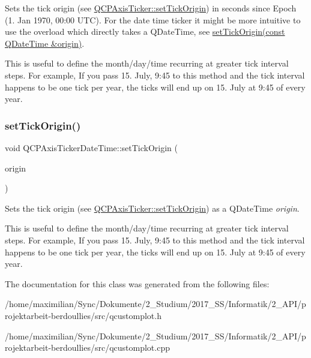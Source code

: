 Sets the tick origin (see \hyperlink{class_q_c_p_axis_ticker_ab509c7e500293bf66a8409f0d7c23943}{Q\+C\+P\+Axis\+Ticker\+::set\+Tick\+Origin}) in seconds since Epoch (1. Jan 1970, 00\+:00 U\+TC). For the date time ticker it might be more intuitive to use the overload which directly takes a Q\+Date\+Time, see \hyperlink{class_q_c_p_axis_ticker_date_time_a2ea905872b8171847a49a5e093fb0c48}{set\+Tick\+Origin(const Q\+Date\+Time \&origin)}.

This is useful to define the month/day/time recurring at greater tick interval steps. For example, If you pass 15. July, 9\+:45 to this method and the tick interval happens to be one tick per year, the ticks will end up on 15. July at 9\+:45 of every year. \mbox{\label{class_q_c_p_axis_ticker_date_time_a2ea905872b8171847a49a5e093fb0c48}} 
\subsubsection{\texorpdfstring{set\+Tick\+Origin()}{setTickOrigin()}\hspace{0.1cm}{\footnotesize\ttfamily [2/2]}}
{\footnotesize\ttfamily void Q\+C\+P\+Axis\+Ticker\+Date\+Time\+::set\+Tick\+Origin (\begin{DoxyParamCaption}\item[{const Q\+Date\+Time \&}]{origin }\end{DoxyParamCaption})}

Sets the tick origin (see \hyperlink{class_q_c_p_axis_ticker_ab509c7e500293bf66a8409f0d7c23943}{Q\+C\+P\+Axis\+Ticker\+::set\+Tick\+Origin}) as a Q\+Date\+Time {\itshape origin}.

This is useful to define the month/day/time recurring at greater tick interval steps. For example, If you pass 15. July, 9\+:45 to this method and the tick interval happens to be one tick per year, the ticks will end up on 15. July at 9\+:45 of every year. 

The documentation for this class was generated from the following files\+:\begin{DoxyCompactItemize}
\item 
/home/maximilian/\+Sync/\+Dokumente/2\+\_\+\+Studium/2017\+\_\+\+S\+S/\+Informatik/2\+\_\+\+A\+P\+I/projektarbeit-\/berdoullies/src/qcustomplot.\+h\item 
/home/maximilian/\+Sync/\+Dokumente/2\+\_\+\+Studium/2017\+\_\+\+S\+S/\+Informatik/2\+\_\+\+A\+P\+I/projektarbeit-\/berdoullies/src/qcustomplot.\+cpp\end{DoxyCompactItemize}
